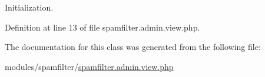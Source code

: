 Initialization. 



Definition at line 13 of file spamfilter.\+admin.\+view.\+php.



The documentation for this class was generated from the following file\+:\begin{DoxyCompactItemize}
\item 
modules/spamfilter/\hyperlink{spamfilter_8admin_8view_8php}{spamfilter.\+admin.\+view.\+php}\end{DoxyCompactItemize}
